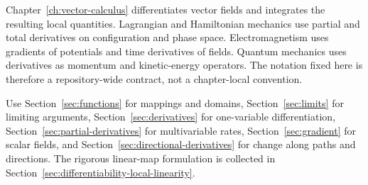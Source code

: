 \begin{bookinsight}
Chapter~\ref{ch:vector-calculus} differentiates vector fields and integrates the
resulting local quantities.  Lagrangian and Hamiltonian mechanics use partial
and total derivatives on configuration and phase space.  Electromagnetism uses
gradients of potentials and time derivatives of fields.  Quantum mechanics
uses derivatives as momentum and kinetic-energy operators.  The notation fixed
here is therefore a repository-wide contract, not a chapter-local convention.
\end{bookinsight}

\begin{summarybox}
Use Section~\ref{sec:functions} for mappings and domains,
Section~\ref{sec:limits} for limiting arguments,
Section~\ref{sec:derivatives} for one-variable differentiation,
Section~\ref{sec:partial-derivatives} for multivariable rates,
Section~\ref{sec:gradient} for scalar fields, and
Section~\ref{sec:directional-derivatives} for change along paths and directions.
The rigorous linear-map formulation is collected in
Section~\ref{sec:differentiability-local-linearity}.
\end{summarybox}

